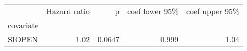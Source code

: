 \begin{tabular}{lrrrr}
\toprule
{} &  Hazard ratio &      p &  coef lower 95\% &  coef upper 95\% \\
covariate &               &        &                  &                  \\
\midrule
SIOPEN    &          1.02 & 0.0647 &            0.999 &             1.04 \\
\bottomrule
\end{tabular}
